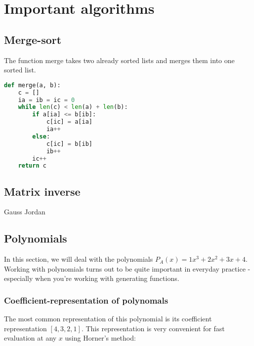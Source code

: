 \section{Important algorithms}

\subsection{Merge-sort}

The function merge takes two already sorted lists and merges them into one sorted list.

\begin{lstlisting}[language=python]
def merge(a, b):
    c = []
    ia = ib = ic = 0
    while len(c) < len(a) + len(b):
        if a[ia] <= b[ib]:
            c[ic] = a[ia]
            ia++
        else:
            c[ic] = b[ib]
            ib++
        ic++
    return c
\end{lstlisting}



\subsection{Matrix inverse}
Gauss Jordan

\subsection{Polynomials}
In this section, we will deal with the polynomials $P_A(x) = 1x^3 + 2x^2 + 3x + 4$. Working with polynomials turns out to be quite important in everyday practice - especially when you're working with generating functions.

\subsubsection{Coefficient-representation of polynomals}
The most common representation of this polynomial is its coefficient representation $[4, 3, 2, 1]$. This representation is very convenient for fast evaluation at any $x$ using Horner's method: 

